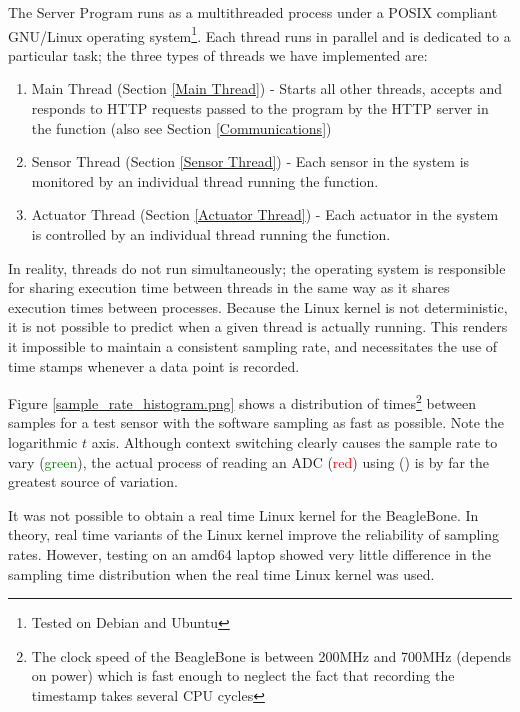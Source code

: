 The Server Program runs as a multithreaded process under a POSIX compliant GNU/Linux operating system\footnote{Tested on Debian and Ubuntu}. Each thread runs in parallel and is dedicated to a particular task; the three types of threads we have implemented are:
\begin{enumerate}
  \item Main Thread (Section \ref{Main Thread}) - Starts all other threads, accepts and responds to HTTP requests passed to the program by the HTTP server in the  function (also see Section \ref{Communications})
  \item Sensor Thread (Section \ref{Sensor Thread}) - Each sensor in the system is monitored by an individual thread running the  function.
  \item Actuator Thread (Section \ref{Actuator Thread}) - Each actuator in the system is controlled by an individual thread running the  function.
\end{enumerate}


In reality, threads do not run simultaneously; the operating system is responsible for sharing execution time between threads in the same way as it shares execution times between processes. Because the Linux kernel is not deterministic, it is not possible to predict when a given thread is actually running. This renders it impossible to maintain a consistent sampling rate, and necessitates the use of time stamps whenever a data point is recorded. 

Figure \ref{sample_rate_histogram.png} shows a distribution of times\footnote{The clock speed of the BeagleBone is between 200MHz and 700MHz (depends on power)\cite{cameon.net} which is fast enough to neglect the fact that recording the timestamp takes several CPU cycles} between samples for a test sensor with the software sampling as fast as possible. Note the logarithmic $t$ axis. Although context switching clearly causes the sample rate to vary (\textcolor{green}{green}), the actual process of reading an ADC (\textcolor{red}{red}) using  () is by far the greatest source of variation.

It was not possible to obtain a real time Linux kernel for the BeagleBone. In theory, real time variants of the Linux kernel improve the reliability of sampling rates. However, testing on an amd64 laptop showed very little difference in the sampling time distribution when the real time Linux kernel was used.


